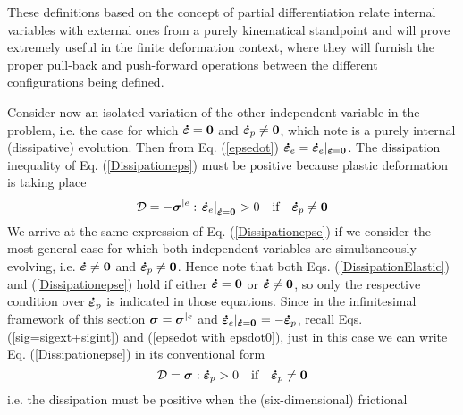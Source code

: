 \documentclass[preprint,review,12pt,sort&compress]{elsarticle}%
\newcommand{\epsdo}[0]{\scriptsize\mathbf{\dot \varepsilon} = \mathbf{0}\normalsize\mathbf{}}
\renewcommand{\mathbf}[1]{\mbox{\boldmath $#1$ \unboldmath}  \!\!}
\begin{document}
These definitions based on the concept of partial differentiation relate
internal variables with external ones from a purely kinematical standpoint and
will prove extremely useful in the finite deformation context, where they will
furnish the proper pull-back and push-forward operations between the different
configurations being defined.

Consider now an isolated variation of the other independent variable in the
problem, i.e. the case for which $\mathbf{\dot{\varepsilon}}=\mathbf{0}$ and
$\mathbf{\dot{\varepsilon}}_{p}\neq\mathbf{0}$, which note is a purely
internal (dissipative) evolution. Then from Eq. (\ref{epsedot}) $\mathbf{\dot
{\varepsilon}}_{e}=\mathbf{\dot{\varepsilon}}_{e}|_{%
\epsdo
}$. The dissipation inequality of Eq. (\ref{Dissipationeps}) must be positive
because plastic deformation is taking place%
\begin{equation}
\mathcal{D}=-\mathbf{\sigma}^{|e}:\left.  \mathbf{\dot{\varepsilon}}%
_{e}\right\vert _{%
\epsdo
}>0\text{\quad if}\quad\mathbf{\dot{\varepsilon}}_{p}\neq\mathbf{0}
\label{Dissipationepse}%
\end{equation}
We arrive at the same expression of Eq. (\ref{Dissipationepse}) if we consider
the most general case for which both independent variables are simultaneously
evolving, i.e. $\mathbf{\dot{\varepsilon}}\neq\mathbf{0}$ and $\mathbf{\dot
{\varepsilon}}_{p}\neq\mathbf{0}$. Hence note that both Eqs.
(\ref{DissipationElastic}) and (\ref{Dissipationepse}) hold if either
$\mathbf{\dot{\varepsilon}}=\mathbf{0}$ or $\mathbf{\dot{\varepsilon}}%
\neq\mathbf{0}$, so only the respective condition over $\mathbf{\dot
{\varepsilon}}_{p}$ is indicated in those equations. Since in the
infinitesimal framework of this section $\mathbf{\sigma}=\mathbf{\sigma}^{|e}$
and $\mathbf{\dot{\varepsilon}}_{e}|_{%
\epsdo
}=-\mathbf{\dot{\varepsilon}}_{p}$, recall Eqs. (\ref{sig=sigext+sigint}) and
(\ref{epsedot with epsdot0}), just in this case we can write Eq.
(\ref{Dissipationepse}) in its conventional form%
\begin{equation}
\mathcal{D}=\mathbf{\sigma}:\mathbf{\dot{\varepsilon}}_{p}>0\text{\quad
if}\quad\mathbf{\dot{\varepsilon}}_{p}\neq\mathbf{0} \label{Dissipationepsp}%
\end{equation}
i.e. the dissipation must be positive when the (six-dimensional) frictional
\end{document}

